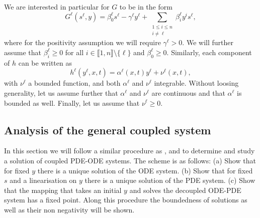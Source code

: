 \documentclass[11pt]{article}
\newcommand{\llb}{\llbracket}
\newcommand{\rrb}{\rrbracket}
\numberwithin{equation}{section}
\begin{document}
We are interested in particular for \(G\) to be in the form
\begin{equation}
\label{eq:form_of_G}
	G^\ell (s^\ell,y) = \beta_0^\ell s^\ell - \gamma^\ell y^\ell + \sum_{\substack{1\le i\le n\\ i\neq \ell}} \beta_i^\ell y^i s^\ell,
\end{equation}
where for the positivity assumption we will require \( \gamma^\ell > 0\). We will further assume that \(\beta_i^\ell \geq 0\) for all \(i \in \llb 1,n\rrb \setminus\{\ell\}\) and \(\beta_0^\ell \geq 0\). Similarly, each component of \(h\) can be written as
\begin{equation}
\label{eq:form_of_h}
	h^\ell(y^\ell,x,t) = \alpha^\ell (x,t) y^\ell + \nu^\ell (x,t),
\end{equation}
with \(\nu^\ell \) a bounded function, and both \(\alpha^\ell \) and \(\nu^\ell \) integrable. Without loosing generality, let us assume further that \(\alpha^\ell \) and \(\nu^\ell \) are continuous and that \(\alpha^\ell \) is bounded as well. Finally, let us assume that \( \nu^\ell \geq 0\).


\subsection{Analysis of the general coupled system}

In this section we will follow a similar procedure as \cite{Eisenhofer-2013,Ptashnyk-2010,Marciniak-2010}, and \cite{Ptashnyk-2016} to
determine and study a solution of coupled PDE-ODE systems. The scheme is as follows: (a) Show that for fixed \(y\) there is a unique solution of the ODE system. (b) Show that for fixed \(s\) and a linearisation on \(y\) there is a unique solution of the PDE system. (c) Show that the mapping that takes an initial \(y\) and solves the decoupled ODE-PDE system has a fixed point. 
Along this procedure the boundedness of solutions as well as their non negativity will be shown.
\end{document}
